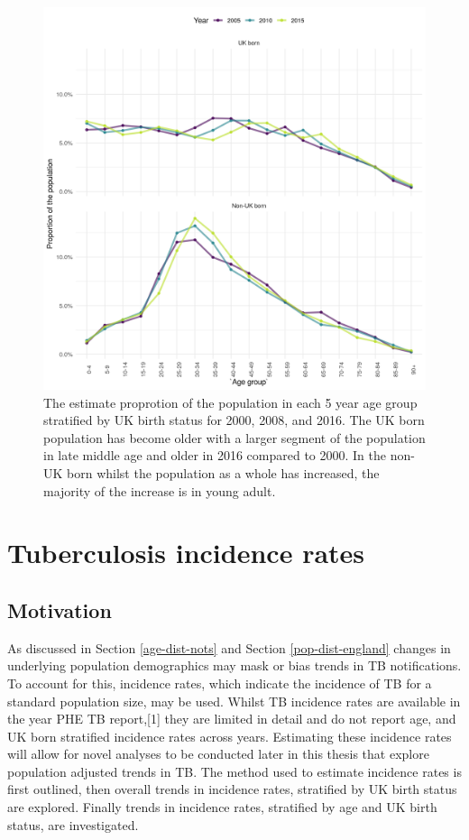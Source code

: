 \documentclass[11pt,twoside]{bristolthesis}
\begin{document}
  \begin{figure}
  
  {\centering \includegraphics[width=0.8\linewidth]{chapters/tb-epi-england/figures/age-dist-pop} 
  
  }
  
  \caption{The estimate proprotion of the population in each 5 year age group stratified by UK birth status for 2000, 2008, and 2016. The UK born population has become older with a larger segment of the population in late middle age and older in 2016 compared to 2000. In the non-UK born whilst the population as a whole has increased, the majority of the increase is in young adult.}\label{fig:age-dist-pop}
  \end{figure}
  \hypertarget{tb-inc-rates-epi}{%
  \section{Tuberculosis incidence rates}\label{tb-inc-rates-epi}}
  
  \hypertarget{motivation}{%
  \subsection{Motivation}\label{motivation}}
  
  As discussed in Section \ref{age-dist-nots} and Section \ref{pop-dist-england} changes in underlying population demographics may mask or bias trends in TB notifications. To account for this, incidence rates, which indicate the incidence of TB for a standard population size, may be used. Whilst TB incidence rates are available in the year PHE TB report,{[}1{]} they are limited in detail and do not report age, and UK born stratified incidence rates across years. Estimating these incidence rates will allow for novel analyses to be conducted later in this thesis that explore population adjusted trends in TB. The method used to estimate incidence rates is first outlined, then overall trends in incidence rates, stratified by UK birth status are explored. Finally trends in incidence rates, stratified by age and UK birth status, are investigated.
  
\end{document}
